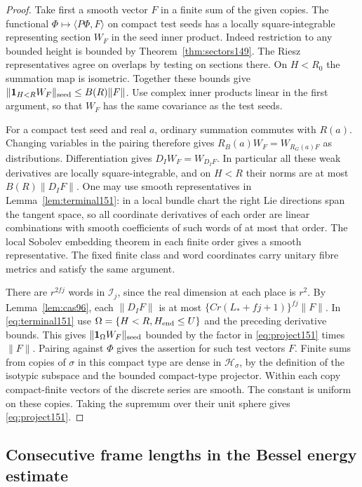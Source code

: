 \documentclass[a4paper,11pt]{article}
\theoremstyle{definition}
\theoremstyle{remark}
\numberwithin{equation}{section}
\begin{document}
\begin{proof}
Take first a smooth vector \(F\) in a finite sum of the given
copies. The functional \(\Phi\mapsto\langle P\Phi,F\rangle\)
on compact test seeds has a locally square-integrable representing
section \(W_F\) in the seed inner product. Indeed restriction to
any bounded height is bounded by Theorem~\ref{thm:sectors149}.
The Riesz representatives agree on overlaps by testing on
sections there. On \(H<R_0\) the summation map is isometric.
Together these bounds give
\(\|\mathbf1_{H<R} W_F\|_{\rm seed}\le B(R)\|F\|\).
Use complex inner products linear in the first argument,
so that \(W_F\) has the same covariance as the test seeds.

For a compact test seed and real \(a\), ordinary summation
commutes with \(R(a)\). Changing variables in the pairing
therefore gives \(R_B(a)W_F=W_{R_G(a)F}\) as distributions.
Differentiation gives \(D_IW_F=W_{D_I F}\). In particular
all these weak derivatives are locally square-integrable,
and on \(H<R\) their norms are at most \(B(R)\|D_I F\|\).
One may use smooth representatives in
Lemma~\ref{lem:terminal151}: in a local bundle chart the
right Lie directions span the tangent space, so all coordinate
derivatives of each order are linear combinations with smooth
coefficients of such words of at most that order. The local
Sobolev embedding theorem in each finite order gives a smooth
representative. The fixed finite class and word coordinates
carry unitary fibre metrics and satisfy the same argument.

There are \(r^{2fj}\) words in \(\mathcal I_j\), since the
real dimension at each place is \(r^2\). By
Lemma~\ref{lem:cas96}, each \(\|D_I F\|\) is at most
\(\{C r(L_*+fj+1)\}^{fj}\|F\|\).
In \eqref{eq:terminal151} use
\(\Omega=\{H<R,H_{\rm end}\le U\}\) and the preceding
derivative bounds. This gives
\(\|\mathbf1_\Omega W_F\|_{\rm seed}\) bounded by the factor
in \eqref{eq:project151} times \(\|F\|\). Pairing against
\(\Phi\) gives the assertion for such test vectors \(F\).
Finite sums from copies of \(\sigma\) in this compact type
are dense in \(\mathcal H_\sigma\), by the definition of
the isotypic subspace and the bounded compact-type projector.
Within each copy compact-finite vectors of the discrete series
are smooth. The constant is uniform on these copies. Taking
the supremum over their unit sphere gives \eqref{eq:project151}.
\end{proof}

\subsection{Consecutive frame lengths in the Bessel energy estimate}\label{nav:VII-06}
\label{sec:ratios153}
\end{document}
